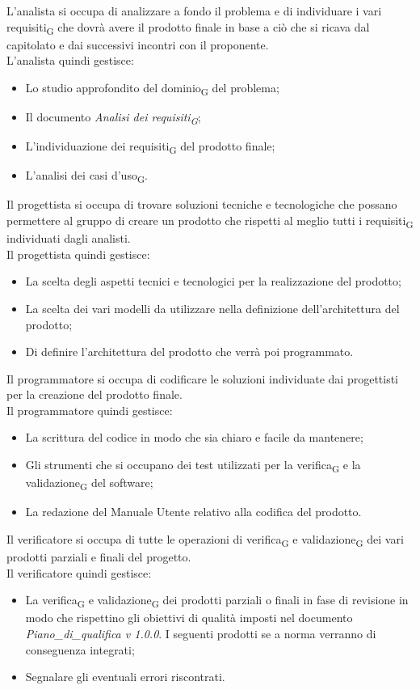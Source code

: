 	L'analista si occupa di analizzare a fondo il problema e di individuare i vari requisiti\textsubscript{G} che dovrà avere il prodotto finale in base a ciò che si ricava dal capitolato e dai successivi incontri con il proponente. \\
	L'analista quindi gestisce:
	\begin{itemize}
		\item Lo studio approfondito del dominio\textsubscript{G} del problema;
		\item Il documento \textit{Analisi dei requisiti\textsubscript{G}};
		\item L'individuazione dei requisiti\textsubscript{G} del prodotto finale;
		\item L'analisi dei casi d'uso\textsubscript{G}.
	\end{itemize}
	Il progettista si occupa di trovare soluzioni tecniche e tecnologiche che possano permettere al gruppo di creare un prodotto che rispetti al meglio tutti i requisiti\textsubscript{G} individuati dagli analisti. \\
	Il progettista quindi gestisce:
	\begin{itemize}
		\item La scelta degli aspetti tecnici e tecnologici per la realizzazione del prodotto;
		\item La scelta dei vari modelli da utilizzare nella definizione dell'architettura del prodotto;
		\item Di definire l'architettura del prodotto che verrà poi programmato.
	\end{itemize}
	Il programmatore si occupa di codificare le soluzioni individuate dai progettisti per la creazione del prodotto finale. \\
	Il programmatore quindi gestisce:
	\begin{itemize}
		\item La scrittura del codice in modo che sia chiaro e facile da mantenere;
		\item Gli strumenti che si occupano dei test utilizzati per la verifica\textsubscript{G} e la validazione\textsubscript{G} del software;
		\item La redazione del Manuale Utente relativo alla codifica del prodotto.
	\end{itemize}
	Il verificatore si occupa di tutte le operazioni di verifica\textsubscript{G} e validazione\textsubscript{G} dei vari prodotti parziali e finali del progetto. \\
	Il verificatore quindi gestisce:
	\begin{itemize}
		\item La verifica\textsubscript{G} e validazione\textsubscript{G} dei prodotti parziali o finali in fase di revisione in modo che rispettino gli obiettivi di qualità imposti nel documento \textit{Piano\_di\_qualifica v 1.0.0}. I seguenti prodotti se a norma verranno di conseguenza integrati;
		\item Segnalare gli eventuali errori riscontrati.
	\end{itemize}
